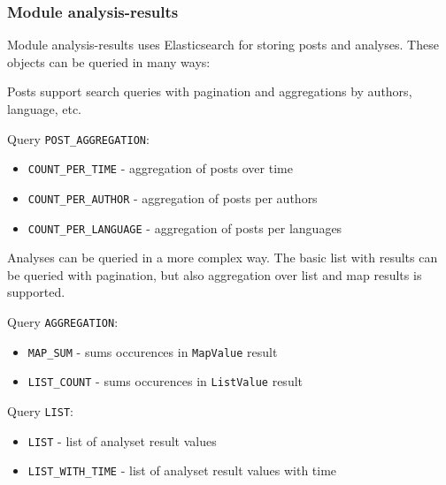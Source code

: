 \subsubsection{Module analysis-results}

Module analysis-results uses Elasticsearch for storing posts and analyses. These objects can be queried in many ways:

Posts support search queries with pagination and aggregations by authors, language, etc.

\begin{description}
    \item Query \texttt{POST\_AGGREGATION}:
    \begin{itemize}
        \item \texttt{COUNT\_PER\_TIME} - aggregation of posts over time
        \item \texttt{COUNT\_PER\_AUTHOR} - aggregation of posts per authors
        \item \texttt{COUNT\_PER\_LANGUAGE} - aggregation of posts per languages
    \end{itemize}
\end{description}

Analyses can be queried in a more complex way. The basic list with results can be queried with pagination, but also aggregation over list and map results is supported.

\begin{description}
    \item Query \texttt{AGGREGATION}:
    \begin{itemize}
        \item \texttt{MAP\_SUM} - sums occurences in \texttt{MapValue} result
        \item \texttt{LIST\_COUNT} - sums occurences in \texttt{ListValue} result
    \end{itemize}
    \item Query \texttt{LIST}:
    \begin{itemize}
        \item \texttt{LIST} - list of analyset result values
        \item \texttt{LIST\_WITH\_TIME} - list of analyset result values with time
    \end{itemize}
\end{description}

